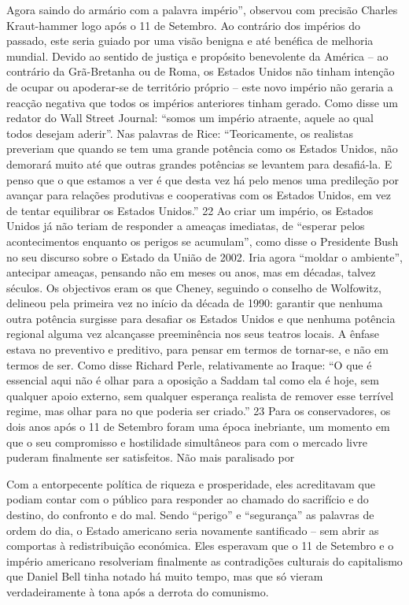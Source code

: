  \par 
Agora saindo do armário com a palavra império”, observou com precisão Charles Kraut-hammer logo após o {\color{blue}11} de Setembro. Ao contrário dos impérios do passado, este seria guiado por uma visão benigna e até benéfica de melhoria mundial. Devido ao sentido de justiça e propósito benevolente da América – ao contrário da Grã-Bretanha ou de Roma, os Estados Unidos não tinham intenção de ocupar ou apoderar-se de território próprio – este novo império não geraria a reacção negativa que todos os impérios anteriores tinham gerado. Como disse um redator do Wall Street Journal: “somos um império atraente, aquele ao qual todos desejam aderir”. Nas palavras de Rice: “Teoricamente, os realistas preveriam que quando se tem uma grande potência como os Estados Unidos, não demorará muito até que outras grandes potências se levantem para desafiá-la. E penso que o que estamos a ver é que desta vez há pelo menos uma predileção por avançar para relações produtivas e cooperativas com os Estados Unidos, em vez de tentar equilibrar os Estados Unidos.” {\color{blue}22} Ao criar um império, os Estados Unidos já não teriam de responder a ameaças imediatas, de “esperar pelos acontecimentos enquanto os perigos se acumulam”, como disse o Presidente Bush no seu discurso sobre o Estado da União de 2002. Iria agora “moldar o ambiente”, antecipar ameaças, pensando não em meses ou anos, mas em décadas, talvez séculos. Os objectivos eram os que Cheney, seguindo o conselho de Wolfowitz, delineou pela primeira vez no início da década de 1990: garantir que nenhuma outra potência surgisse para desafiar os Estados Unidos e que nenhuma potência regional alguma vez alcançasse preeminência nos seus teatros locais. A ênfase estava no preventivo e preditivo, para pensar em termos de tornar-se, e não em termos de ser. Como disse Richard Perle, relativamente ao Iraque: “O que é essencial aqui não é olhar para a oposição a Saddam tal como ela é hoje, sem qualquer apoio externo, sem qualquer esperança realista de remover esse terrível regime, mas olhar para no que poderia ser criado.” {\color{blue}23} Para os conservadores, os dois anos após o {\color{blue}11} de Setembro foram uma época inebriante, um momento em que o seu compromisso e hostilidade simultâneos para com o mercado livre puderam finalmente ser satisfeitos. Não mais paralisado por
 \par 
Com a entorpecente política de riqueza e prosperidade, eles acreditavam que podiam contar com o público para responder ao chamado do sacrifício e do destino, do confronto e do mal. Sendo “perigo” e “segurança” as palavras de ordem do dia, o Estado americano seria novamente santificado – sem abrir as comportas à redistribuição económica. Eles esperavam que o {\color{blue}11} de Setembro e o império americano resolveriam finalmente as contradições culturais do capitalismo que Daniel Bell tinha notado há muito tempo, mas que só vieram verdadeiramente à tona após a derrota do comunismo.
